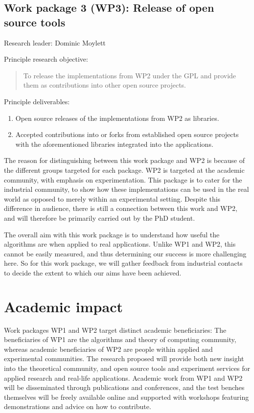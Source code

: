 \documentclass[a4paper,11pt]{article}
\begin{document}
    \subsection*{Work package 3 (WP3): Release of open source tools}

    Research leader: Dominic Moylett

    Principle research objective:
    \begin{quote}
        To release the implementations from WP2 under the GPL and provide them as contributions into other open source projects.
    \end{quote}

    Principle deliverables:
    \begin{enumerate}
        \item Open source releases of the implementations from WP2 as libraries.
        \item Accepted contributions into or forks from established open source projects with the aforementioned libraries integrated into the applications.
    \end{enumerate}

    The reason for distinguishing between this work package and WP2 is because of the different groups targeted for each package. WP2 is targeted at the academic community, with emphasis on experimentation. This package is to cater for the industrial community, to show how these implementations can be used in the real world as opposed to merely within an experimental setting. Despite this difference in audience, there is still a connection between this work and WP2, and will therefore be primarily carried out by the PhD student.

    The overall aim with this work package is to understand how useful the algorithms are when applied to real applications. Unlike WP1 and WP2, this cannot be easily measured, and thus determining our success is more challenging here. So for this work package, we will gather feedback from industrial contacts to decide the extent to which our aims have been achieved.

    \section{Academic impact}

    Work packages WP1 and WP2 target distinct academic beneficiaries: The beneficiaries of WP1 are the algorithms and theory of computing community, whereas academic beneficiaries of WP2 are people within applied and experimental communities. The research proposed will provide both new insight into the theoretical community, and open source tools and experiment services for applied research and real-life applications. Academic work from WP1 and WP2 will be disseminated through publications and conferences, and the test benches themselves will be freely available online and supported with workshops featuring demonstrations and advice on how to contribute.
    
\end{document}
